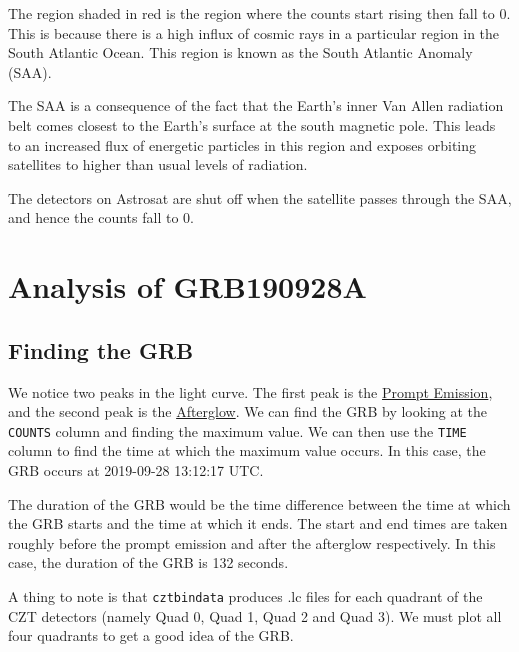 \documentclass[11pt]{book} %
\begin{document}
The region shaded in red is the region where the counts start rising then fall to 0. This is because there is a high influx of cosmic rays in a particular region in the South Atlantic Ocean. This region is known as the South Atlantic Anomaly (SAA). 

The SAA is a consequence of the fact that the Earth's inner Van Allen radiation belt comes closest to the Earth's surface at the south magnetic pole. This leads to an increased flux of energetic particles in this region and exposes orbiting satellites to higher than usual levels of radiation. 

The detectors on Astrosat are shut off when the satellite passes through the SAA, and hence the counts fall to 0. 

\section{Analysis of GRB190928A}

\subsection{Finding the GRB}

We notice two peaks in the light curve. The first peak is the \href{https://arxiv.org/pdf/1402.7022.pdf}{Prompt Emission}, and the second peak is the \href{https://astronomy.swin.edu.au/cosmos/G/Gamma+ray+burst+afterglow}{Afterglow}. We can find the GRB by looking at the \lstinline[language=Python]{COUNTS} column and finding the maximum value. We can then use the \lstinline[language=Python]{TIME} column to find the time at which the maximum value occurs. In this case, the GRB occurs at 2019-09-28 13:12:17 UTC. 

The duration of the GRB would be the time difference between the time at which the GRB starts and the time at which it ends. The start and end times are taken roughly before the prompt emission and after the afterglow respectively. In this case, the duration of the GRB is 132 seconds.

A thing to note is that \lstinline{cztbindata} produces .lc files for each quadrant of the CZT detectors (namely Quad 0, Quad 1, Quad 2 and Quad 3). We must plot all four quadrants to get a good idea of the GRB.
\end{document}
